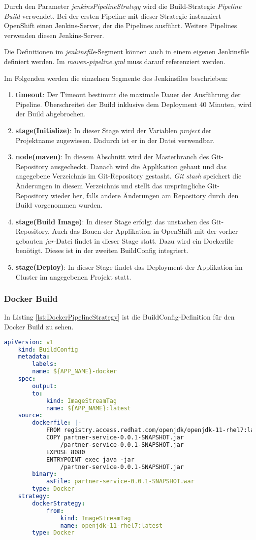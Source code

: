 Durch den Parameter \textit{jenkinsPipelineStrategy} wird die Build-Strategie \textit{Pipeline Build} verwendet. Bei der ersten Pipeline mit dieser Strategie instanziert OpenShift einen Jenkins-Server, der die Pipelines ausführt. Weitere Pipelines verwenden diesen Jenkins-Server.

Die Definitionen im \textit{jenkinsfile}-Segment können auch in einem eigenen Jenkinsfile definiert werden. Im \textit{maven-pipeline.yml} muss darauf referenziert werden.

Im Folgenden werden die einzelnen Segmente des Jenkinsfiles beschrieben:
\begin{enumerate}
	\item \textbf{timeout}: Der Timeout bestimmt die maximale Dauer der Ausführung der Pipeline. Überschreitet der Build inklusive dem Deployment 40 Minuten, wird der Build abgebrochen.
	\item \textbf{stage(\grqq Initialize\grqq)}: In dieser Stage wird der Variablen \textit{project} der Projektname zugewiesen. Dadurch ist er in der Datei verwendbar.
	\item \textbf{node(\grqq maven\grqq)}: In diesem Abschnitt wird der Masterbranch des Git-Repository ausgecheckt. Danach wird die Applikation gebaut und das angegebene Verzeichnis im Git-Repository gestasht. \textit{Git stash} speichert die Änderungen in diesem Verzeichnis und stellt das ursprüngliche Git-Repository wieder her, falls andere Änderungen am Repository durch den Build vorgenommen wurden.
	\item \textbf{stage(\grqq Build Image\grqq)}: In dieser Stage erfolgt das unstashen des Git-Repository. Auch das Bauen der Applikation in OpenShift mit der vorher gebauten \textit{jar}-Datei findet in dieser Stage statt. Dazu wird ein Dockerfile benötigt. Dieses ist in der zweiten BuildConfig integriert.
	\item \textbf{stage(\grqq Deploy\grqq)}: In dieser Stage findet das Deployment der Applikation im Cluster im angegebenen Projekt statt. 
\end{enumerate}

\subsubsection{Docker Build}
In Listing \ref{lst:DockerPipelineStrategy} ist die BuildConfig-Definition für den Docker Build zu sehen.

\begin{lstlisting}[language=yml, caption=maven-pipeline.yml - Docker BuildConfig, label=lst:DockerPipelineStrategy]
	apiVersion: v1
	kind: BuildConfig
	metadata:
		labels:
		name: ${APP_NAME}-docker
	spec:
		output:
		to:
			kind: ImageStreamTag
			name: ${APP_NAME}:latest
	source:
		dockerfile: |-
			FROM registry.access.redhat.com/openjdk/openjdk-11-rhel7:latest
			COPY partner-service-0.0.1-SNAPSHOT.jar 
				/partner-service-0.0.1-SNAPSHOT.jar
			EXPOSE 8080
			ENTRYPOINT exec java -jar 
				/partner-service-0.0.1-SNAPSHOT.jar
		binary:
			asFile: partner-service-0.0.1-SNAPSHOT.war
		type: Docker
	strategy:
		dockerStrategy:
			from:
				kind: ImageStreamTag
				name: openjdk-11-rhel7:latest
		type: Docker
\end{lstlisting}

